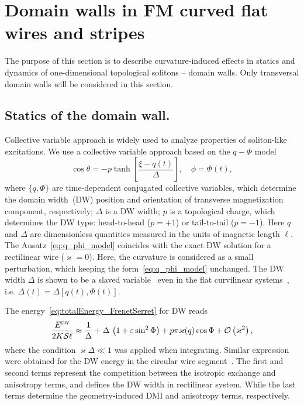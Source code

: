 \section{Domain walls in FM curved flat wires and stripes}\label{sec:DW_dyn}

The purpose of this section is to describe curvature-induced effects in statics and dynamics of one-dimensional topological solitons -- domain walls. Only transversal domain walls will be considered in this section.

\subsection{Statics of the domain wall.} Collective variable approach is widely used to analyze properties of soliton-like excitations. We use a collective variable approach based on the $q-\Phi$ model~\cite{Slonczewski72,Malozemoff79}
\begin{equation}\label{eq:q_phi_model}
\cos\theta=-p\tanh\left[\frac{\xi-q(t)}{\Delta}\right],\quad\phi=\Phi(t),
\end{equation}
where $\{q, \Phi\}$ are time-dependent conjugated collective variables, which determine the domain width~(DW) position and orientation of transverse magnetization component, respectively; $\Delta$ is a DW width; $p$ is a topological charge, which determines the DW type: head-to-head ($p = +1$) or tail-to-tail ($p = -1$). Here $q$ and $\Delta$ are dimensionless quantities measured in the units of magnetic length $\ell$. The Ansatz~\eqref{eq:q_phi_model} coincides with the exact DW solution for a rectilinear wire ($\varkappa=0$). Here, the curvature is considered as a small perturbation, which keeping the form~\eqref{eq:q_phi_model} unchanged. The DW width $\Delta$ is shown to be a slaved variable~\cite{Hillebrands06} even in the flat curvilinear systems~\cite{Yershov18a}, i.e. $\Delta(t) = \Delta\left[q(t),\Phi(t)\right]$.

The energy~\eqref{eq:totalEnergy_FrenetSerret} for DW reads
\begin{equation}\label{eq:dw_energy}
	\frac{E^\textsc{dw}}{2K\mathcal{S}\ell}\approx\frac{1}{\Delta}+\Delta\,\left(1+\varepsilon\sin^2\Phi\right)+p\pi\varkappa(q)\cos\Phi+\mathcal{O}\left(\varkappa^2\right),
\end{equation}
where the condition $\varkappa\Delta\ll1$ was applied when integrating. Similar expression were obtained for the DW energy in the circular wire segment~\cite{Kruger07a}. The first and second terms represent the competition between the isotropic exchange and anisotropy terms, and defines the DW width in rectilinear system. While the last terms determine the geometry-induced DMI and anisotropy terms, respectively.

